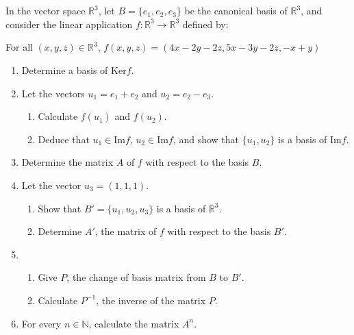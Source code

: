 \documentclass[12pt]{article}
\begin{document}
\newpage

\section{}
In the vector space $\mathbb{R}^3$, let $B = \{e_1, e_2, e_3\}$ be the canonical basis of $\mathbb{R}^3$, and consider the linear application $f: \mathbb{R}^3 \to \mathbb{R}^3$ defined by: 

For all $(x,y,z) \in \mathbb{R}^3$, $f(x,y,z) = (4x - 2y - 2z, 5x - 3y - 2z, -x + y)$

\begin{enumerate}
    \item Determine a basis of $\text{Ker}f$.
    \item Let the vectors $u_1 = e_1 + e_2$ and $u_2 = e_2 - e_3$.
    \begin{enumerate}
        \item Calculate $f(u_1)$ and $f(u_2)$.
        \item Deduce that $u_1 \in \text{Im}f$, $u_2 \in \text{Im}f$, and show that $\{u_1, u_2\}$ is a basis of $\text{Im}f$.
    \end{enumerate}
    \item Determine the matrix $A$ of $f$ with respect to the basis $B$.
    \item Let the vector $u_3 = (1,1,1)$.
    \begin{enumerate}
        \item Show that $B' = \{u_1, u_2, u_3\}$ is a basis of $\mathbb{R}^3$.
        \item Determine $A'$, the matrix of $f$ with respect to the basis $B'$.
    \end{enumerate}
    \item 
    \begin{enumerate}
        \item Give $P$, the change of basis matrix from $B$ to $B'$.
        \item Calculate $P^{-1}$, the inverse of the matrix $P$.
    \end{enumerate}
    \item For every $n \in \mathbb{N}$, calculate the matrix $A^n$.
\end{enumerate}

\newpage
\end{document}
